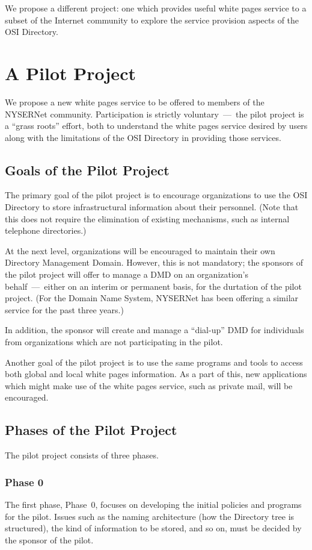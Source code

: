 We propose a different project:
one which provides useful white pages service to a subset of the Internet
community to explore the service provision aspects of the OSI Directory.

\section	{A Pilot Project}
We propose a new white pages service to be offered to members of the NYSERNet
community.
Participation is strictly voluntary~---~the pilot project is a ``grass roots''
effort,
both to understand the white pages service desired by users along with
the limitations of the OSI Directory in providing those services.

\subsection	{Goals of the Pilot Project}
The primary goal of the pilot project is to encourage organizations to use
the OSI Directory to store infrastructural information about their personnel.
(Note that this does not require the elimination of existing mechanisms,
such as internal telephone directories.)

At the next level,
organizations will be encouraged to maintain their own Directory Management
Domain.
However,
this is not mandatory;
the sponsors of the pilot project will offer to
manage a DMD on an organization's behalf~---~either on an interim or
permanent basis, for the durtation of the pilot project.
(For the Domain Name System,
NYSERNet has been offering a similar service for the past three years.)

In addition,
the sponsor will create and manage a ``dial-up'' DMD for
individuals from organizations which are not participating in the pilot.

Another goal of the pilot project is to use the same programs and tools to
access both global and local white pages information.
As a part of this,
new applications which might make use of the white pages service,
such as private mail,
will be encouraged.

\subsection	{Phases of the Pilot Project}
The pilot project consists of three phases.

\subsubsection	{Phase 0}
The first phase, Phase~0, focuses on developing the initial policies and
programs for the pilot.
Issues such as the naming architecture (how the Directory tree is structured),
the kind of information to be stored,
and so on,
must be decided by the sponsor of the pilot.

